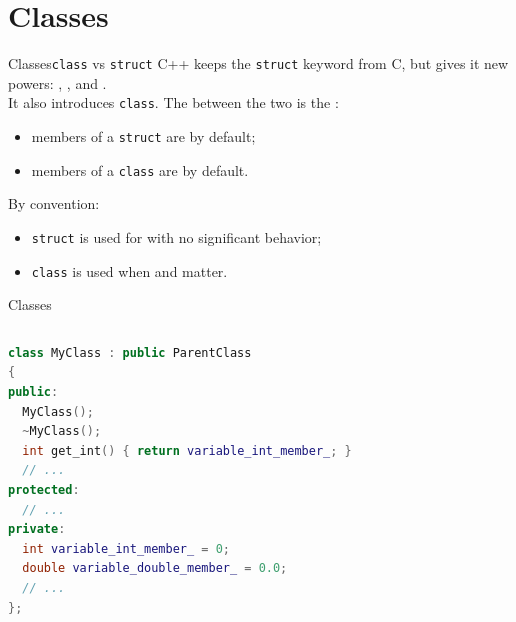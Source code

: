 
\section{Classes}
\graphicspath{{figs/section2/}}

\begin{frame}{Classes}{\texttt{class} vs \texttt{struct}}
	\justifying
	C++ keeps the \texttt{struct} keyword from C, but gives it new powers: , , and .\\
	\bigskip
	It also introduces \texttt{class}. The  between the two is the :
	\begin{itemize}
		\item members of a \texttt{struct} are  by default;
		\item members of a \texttt{class} are  by default.
	\end{itemize}
	\bigskip
	By convention:
	\begin{itemize}
		\item \texttt{struct} is used for  with no significant behavior;
		\item \texttt{class} is used when  and  matter.
	\end{itemize}
\end{frame}
\begin{frame}[fragile]{Classes}
  \begin{columns}
		\begin{lstlisting}[style=codebeamer, language=C++, caption=Example of a C++ class.]
class MyClass : public ParentClass
{
public:
  MyClass();
  ~MyClass();
  int get_int() { return variable_int_member_; }
  // ...
protected:
  // ...
private:
  int variable_int_member_ = 0;
  double variable_double_member_ = 0.0;
  // ...
};
    \end{lstlisting}
  \end{columns}
\end{frame}
